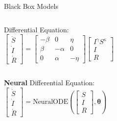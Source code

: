 \documentclass[aspectratio=169,professionalfont,xcolor={dvipsnames},hyperref={colorlinks=true,urlcolor=MidnightBlue}]{beamer}
\begin{document}
\begin{frame}{Black Box Models}
  \begin{columns}
    \centering
    \resizebox{\textwidth}{!}{}

    \centering
    Differential Equation:
    \begin{equation*}
      \begin{bmatrix}
        \dot S \\ \dot I \\ \dot R
      \end{bmatrix}
      =
      \begin{bmatrix}
        -\beta & 0 & \eta \\
        \beta & -\alpha & 0 \\
        0 & \alpha & -\eta
      \end{bmatrix}
      \begin{bmatrix}
        I^\gamma S^\kappa \\ I \\ R
      \end{bmatrix}
    \end{equation*}
  \end{columns}
  \vfill
  \begin{columns}
    \centering
    \resizebox{.4\textwidth}{!}{}

    \centering
    \textbf{Neural} Differential Equation:
    \begin{equation*}
      \begin{bmatrix}
        \dot S\\ \dot I\\ \dot R
      \end{bmatrix}
      = \mathrm{NeuralODE}\left(\begin{bmatrix}
        S \\ I \\ R
      \end{bmatrix}, \bm\theta
      \right)
    \end{equation*}
  \end{columns}
\end{frame}
\end{document}
